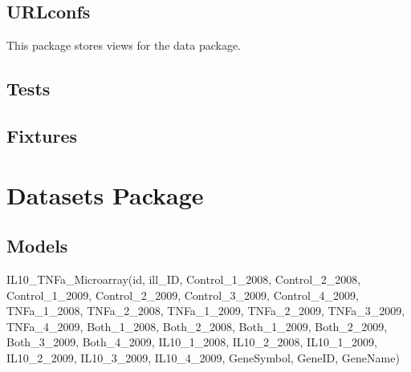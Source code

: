 \documentclass[letterpaper,10pt,english]{sphinxmanual}
\begin{document}
\subsection{URLconfs}
\label{api:urlconfs}\label{api:module-experimentdb.data.urls}
This package stores views for the data package.



\subsection{Tests}
\label{api:tests}

\subsection{Fixtures}
\label{api:fixtures}

\section{Datasets Package}
\label{api:datasets-package}\label{api:module-experimentdb.datasets}

\subsection{Models}
\label{api:id1}\label{api:module-experimentdb.datasets.models}

\begin{fulllineitems}
\label{api:experimentdb.datasets.models.IL10_TNFa_Microarray}
IL10\_TNFa\_Microarray(id, ill\_ID, Control\_1\_2008, Control\_2\_2008, Control\_1\_2009, Control\_2\_2009, Control\_3\_2009, Control\_4\_2009, TNFa\_1\_2008, TNFa\_2\_2008, TNFa\_1\_2009, TNFa\_2\_2009, TNFa\_3\_2009, TNFa\_4\_2009, Both\_1\_2008, Both\_2\_2008, Both\_1\_2009, Both\_2\_2009, Both\_3\_2009, Both\_4\_2009, IL10\_1\_2008, IL10\_2\_2008, IL10\_1\_2009, IL10\_2\_2009, IL10\_3\_2009, IL10\_4\_2009, GeneSymbol, GeneID, GeneName)


\begin{fulllineitems}
\label{api:experimentdb.datasets.models.IL10_TNFa_Microarray.DoesNotExist}
\end{fulllineitems}


\begin{fulllineitems}
\label{api:experimentdb.datasets.models.IL10_TNFa_Microarray.MultipleObjectsReturned}
\end{fulllineitems}


\end{fulllineitems}
\end{document}
